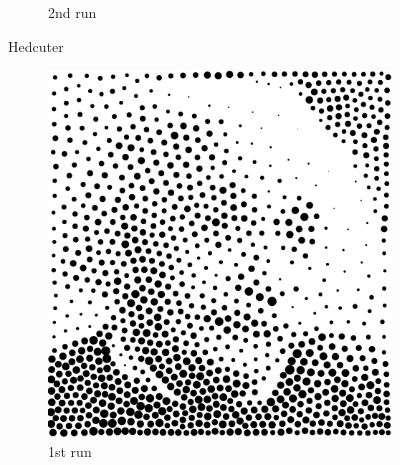 \documentclass[11pt]{article}
\begin{document}
\begin{enumerate}
\begin{figure}[H]
\begin{subfigure}{0.4\textwidth}
        \caption{2nd run}
    \end{subfigure}
    \label{fig:1}
    \caption{Hedcuter}
\end{figure}

\begin{figure}[H]
    \centering
        \begin{subfigure}{0.4\textwidth}
        \centering
        \includegraphics[width=\textwidth]{../results/voronoi/1-1.pdf}
    \caption{1st run}
    \end{subfigure}
    \begin{subfigure}{0.4\textwidth}
        \centering

\end{subfigure}
\end{figure}
\end{enumerate}
\end{document}
